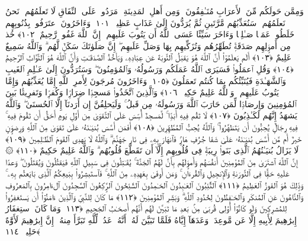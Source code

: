  وَمِمَّن حَولَكُم مِّنَ ٱلأَعرَابِ مُنَـٰفِقُونَ ۖ وَمِن أَهلِ ٱلمَدِينَةِ ۖ مَرَدُوا۟ عَلَى ٱلنِّفَاقِ لَا تَعلَمُهُم ۖ نَحنُ نَعلَمُهُم ۚ سَنُعَذِّبُهُم مَّرَّتَينِ ثُمَّ يُرَدُّونَ إِلَىٰ عَذَابٍ عَظِيمٍۢ ﴿١٠١﴾
 وَءَاخَرُونَ ٱعتَرَفُوا۟ بِذُنُوبِهِم خَلَطُوا۟ عَمَلًۭا صَـٰلِحًۭا وَءَاخَرَ سَيِّئًا عَسَى ٱللَّهُ أَن يَتُوبَ عَلَيهِم ۚ إِنَّ ٱللَّهَ غَفُورٌۭ رَّحِيمٌ ﴿١٠٢﴾
 خُذ مِن أَموَٟلِهِم صَدَقَةًۭ تُطَهِّرُهُم وَتُزَكِّيهِم بِهَا وَصَلِّ عَلَيهِم ۖ إِنَّ صَلَوٰتَكَ سَكَنٌۭ لَّهُم ۗ وَٱللَّهُ سَمِيعٌ عَلِيمٌ ﴿١٠٣﴾
 أَلَم يَعلَمُوٓا۟ أَنَّ ٱللَّهَ هُوَ يَقبَلُ ٱلتَّوبَةَ عَن عِبَادِهِۦ وَيَأخُذُ ٱلصَّدَقَـٰتِ وَأَنَّ ٱللَّهَ هُوَ ٱلتَّوَّابُ ٱلرَّحِيمُ ﴿١٠٤﴾
 وَقُلِ ٱعمَلُوا۟ فَسَيَرَى ٱللَّهُ عَمَلَكُم وَرَسُولُهُۥ وَٱلمُؤمِنُونَ ۖ وَسَتُرَدُّونَ إِلَىٰ عَـٰلِمِ ٱلغَيبِ وَٱلشَّهَـٰدَةِ فَيُنَبِّئُكُم بِمَا كُنتُم تَعمَلُونَ ﴿١٠٥﴾
 وَءَاخَرُونَ مُرجَونَ لِأَمرِ ٱللَّهِ إِمَّا يُعَذِّبُهُم وَإِمَّا يَتُوبُ عَلَيهِم ۗ وَٱللَّهُ عَلِيمٌ حَكِيمٌۭ ﴿١٠٦﴾
 وَٱلَّذِينَ ٱتَّخَذُوا۟ مَسجِدًۭا ضِرَارًۭا وَكُفرًۭا وَتَفرِيقًۢا بَينَ ٱلمُؤمِنِينَ وَإِرصَادًۭا لِّمَن حَارَبَ ٱللَّهَ وَرَسُولَهُۥ مِن قَبلُ ۚ وَلَيَحلِفُنَّ إِن أَرَدنَآ إِلَّا ٱلحُسنَىٰ ۖ وَٱللَّهُ يَشهَدُ إِنَّهُم لَكَـٰذِبُونَ ﴿١٠٧﴾
 لَا تَقُم فِيهِ أَبَدًۭا ۚ لَّمَسجِدٌ أُسِّسَ عَلَى ٱلتَّقوَىٰ مِن أَوَّلِ يَومٍ أَحَقُّ أَن تَقُومَ فِيهِ ۚ فِيهِ رِجَالٌۭ يُحِبُّونَ أَن يَتَطَهَّرُوا۟ ۚ وَٱللَّهُ يُحِبُّ ٱلمُطَّهِّرِينَ ﴿١٠٨﴾
 أَفَمَن أَسَّسَ بُنيَـٰنَهُۥ عَلَىٰ تَقوَىٰ مِنَ ٱللَّهِ وَرِضوَٟنٍ خَيرٌ أَم مَّن أَسَّسَ بُنيَـٰنَهُۥ عَلَىٰ شَفَا جُرُفٍ هَارٍۢ فَٱنهَارَ بِهِۦ فِى نَارِ جَهَنَّمَ ۗ وَٱللَّهُ لَا يَهدِى ٱلقَومَ ٱلظَّـٰلِمِينَ ﴿١٠٩﴾
 لَا يَزَالُ بُنيَـٰنُهُمُ ٱلَّذِى بَنَوا۟ رِيبَةًۭ فِى قُلُوبِهِم إِلَّآ أَن تَقَطَّعَ قُلُوبُهُم ۗ وَٱللَّهُ عَلِيمٌ حَكِيمٌ ﴿١١٠﴾
 ۞ إِنَّ ٱللَّهَ ٱشتَرَىٰ مِنَ ٱلمُؤمِنِينَ أَنفُسَهُم وَأَموَٟلَهُم بِأَنَّ لَهُمُ ٱلجَنَّةَ ۚ يُقَـٰتِلُونَ فِى سَبِيلِ ٱللَّهِ فَيَقتُلُونَ وَيُقتَلُونَ ۖ وَعدًا عَلَيهِ حَقًّۭا فِى ٱلتَّورَىٰةِ وَٱلإِنجِيلِ وَٱلقُرءَانِ ۚ وَمَن أَوفَىٰ بِعَهدِهِۦ مِنَ ٱللَّهِ ۚ فَٱستَبشِرُوا۟ بِبَيعِكُمُ ٱلَّذِى بَايَعتُم بِهِۦ ۚ وَذَٟلِكَ هُوَ ٱلفَوزُ ٱلعَظِيمُ ﴿١١١﴾
 ٱلتَّٰٓئِبُونَ ٱلعَـٰبِدُونَ ٱلحَـٰمِدُونَ ٱلسَّٰٓئِحُونَ ٱلرَّٟكِعُونَ ٱلسَّٰجِدُونَ ٱلءَامِرُونَ بِٱلمَعرُوفِ وَٱلنَّاهُونَ عَنِ ٱلمُنكَرِ وَٱلحَـٰفِظُونَ لِحُدُودِ ٱللَّهِ ۗ وَبَشِّرِ ٱلمُؤمِنِينَ ﴿١١٢﴾
 مَا كَانَ لِلنَّبِىِّ وَٱلَّذِينَ ءَامَنُوٓا۟ أَن يَستَغفِرُوا۟ لِلمُشرِكِينَ وَلَو كَانُوٓا۟ أُو۟لِى قُربَىٰ مِنۢ بَعدِ مَا تَبَيَّنَ لَهُم أَنَّهُم أَصحَـٰبُ ٱلجَحِيمِ ﴿١١٣﴾
 وَمَا كَانَ ٱستِغفَارُ إِبرَٰهِيمَ لِأَبِيهِ إِلَّا عَن مَّوعِدَةٍۢ وَعَدَهَآ إِيَّاهُ فَلَمَّا تَبَيَّنَ لَهُۥٓ أَنَّهُۥ عَدُوٌّۭ لِّلَّهِ تَبَرَّأَ مِنهُ ۚ إِنَّ إِبرَٰهِيمَ لَأَوَّٰهٌ حَلِيمٌۭ ﴿١١٤﴾
